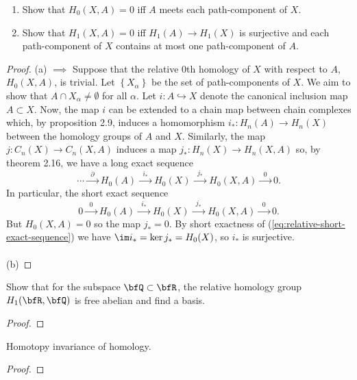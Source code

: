 \begin{problem}[Hatcher {\S}2.1, Ex.\,16]
\begin{enumerate}[label=(\alph*)]
\item Show that $H_0(X,A)=0$ iff $A$ meets each path-component of $X$.
\item Show that $H_1(X,A)=0$ iff $H_1(A)\to H_1(X)$ is surjective and each
  path-component of $X$ contains at most one path-component of $A$.
\end{enumerate}
\end{problem}
\begin{proof}
(a) $\implies$ Suppose that the relative $0$th homology of $X$ with respect
to $A$, $H_0(X,A)$, is trivial. Let $\left\{X_\alpha\right\}$ be the set of
path-components of $X$. We aim to show that $A\cap X_\alpha\neq\emptyset$
for all $\alpha$. Let $i\colon A\hookrightarrow X$ denote the canonical
inclusion map $A\subset X$. Now, the map $i$ can be extended to a chain map
between chain complexes which, by proposition 2.9, induces a homomorphism
$i_*\colon H_n(A)\to H_n(X)$ between the homology groups of $A$ and
$X$. Similarly, the map $j\colon C_n(X)\to C_n(X,A)$ induces a map
$j_*\colon H_n(X)\to H_n(X,A)$ so, by theorem 2.16, we have a long exact
sequence
\begin{equation}
\label{eq:relative-long-exact-sequence}
\cdots\xrightarrow{\;\;\partial\;\;}
H_0(A)\xrightarrow{\;\;i_*\;\;}
H_0(X)\xrightarrow{\;\;j_*\;\;}
H_0(X,A)\xrightarrow{\;\;0\;\;}
0.
\end{equation}
In particular, the short exact sequence
\begin{equation}
\label{eq:relative-short-exact-sequence}
0\xrightarrow{\;\;0\;\;}
H_0(A)\xrightarrow{\;\;i_*\;\;}
H_0(X)\xrightarrow{\;\;j_*\;\;}
H_0(X,A)\xrightarrow{\;\;0\;\;}
0.
\end{equation}
But $H_0(X,A)=0$ so the map $j_*=0$. By short exactness of
(\ref{eq:relative-short-exact-sequence}) we have $\im i_*=\ker j_*=H_0(X)$,
so $i_*$ is surjective.
\\\\
(b)
\end{proof}
\newpage

\begin{problem}[Hatcher {\S}2.1, Ex.\,18]
Show that for the subspace $\bfQ\subset\bfR$, the relative homology group
$H_1(\bfR,\bfQ)$ is free abelian and find a basis.
\end{problem}
\begin{proof}
\end{proof}

\newpage
\begin{problem}
Homotopy invariance of homology.
\end{problem}
\begin{proof}
\end{proof}

